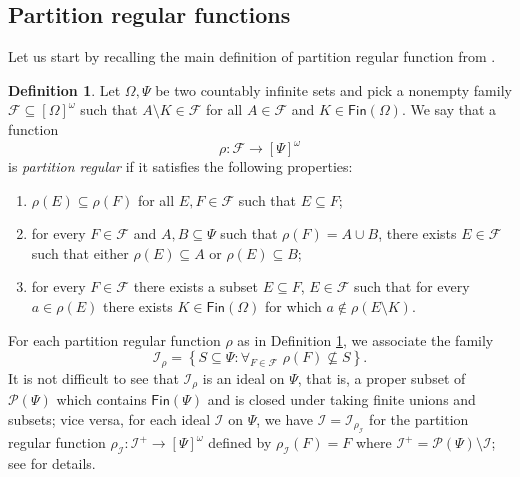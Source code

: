 \documentclass{amsart}
\theoremstyle{plain}
\theoremstyle{definition}
\newtheorem{defi}[thm]{Definition}
\theoremstyle{remark}
\newcommand{\cI}{\mathcal{I}}
\newcommand{\I}{\cI}
\newcommand{\FIN}{\mathsf{Fin}} \newcommand{\fin}{\FIN}
\newcommand{\Fin}{\FIN}
\begin{document}
\subsection{Partition regular functions} Let us start by recalling the main definition of partition regular function from \cite[Definition 3.1]{FKK23}.
\begin{defi}\label{defi:partitionregular}
    Let $\Omega,\Psi$ be two countably infinite sets and pick a nonempty family $\mathcal{F}\subseteq [\Omega]^\omega$ such that $A\setminus K \in \mathcal{F}$ for all $A \in \mathcal{F}$ and $K \in \Fin(\Omega)$. 
    We say that a function 
    \begin{equation*}
\rho: \mathcal{F}\to [\Psi]^\omega
\end{equation*}
is \emph{partition regular} if it satisfies the following properties\textup{:}
    \begin{enumerate}[label={\rm (\roman{*})}]
\item [$\mathrm{(M)}$] $\rho(E)\subseteq \rho(F)$ for all $E,F \in \mathcal{F}$ such that $E\subseteq F$;
\item [$\mathrm{(R)}$] for every $F \in \mathcal{F}$ and $A,B \subseteq \Psi$ such that $\rho(F)=A\cup B$, there exists $E \in \mathcal{F}$ such that either $\rho(E)\subseteq A$ or $\rho(E)\subseteq B$;
\item [$\mathrm{(S)}$] for every $F \in \mathcal{F}$ there exists a subset $E\subseteq F$, $E\in \mathcal{F}$ such that for every $a \in \rho(E)$ there exists $K \in \Fin(\Omega)$ for which $a\notin \rho(E\setminus K)$. 
\end{enumerate}
\end{defi}

For each partition regular function $\rho$ as in Definition \ref{defi:partitionregular}, we associate the family
\begin{equation}\label{eq:generatedideal}
\mathcal{I}_\rho=\left\{S\subseteq \Psi: 
\forall_{F \in \mathcal{F}}\,\,\rho(F)\not\subseteq S
\right\}.
\end{equation}
It is not difficult to see that $\mathcal{I}_\rho$ is an ideal on $\Psi$, that is, a proper subset of $\mathcal{P}(\Psi)$ which contains $\Fin(\Psi)$ and is closed under taking  finite unions and subsets; 
vice versa, for each ideal $\mathcal{I}$ on $\Psi$, we have $\mathcal{I}=\mathcal{I}_{\rho_\I}$ for the partition regular function $\rho_{\mathcal{I}}: \mathcal{I}^+\to [\Psi]^\omega$ defined by 
$\rho_{\mathcal{I}}(F)=F$
where $\mathcal{I}^+=\mathcal{P}(\Psi)\setminus \mathcal{I}$; see \cite[Proposition 3.3]{FKK23} for details. 
\end{document}
